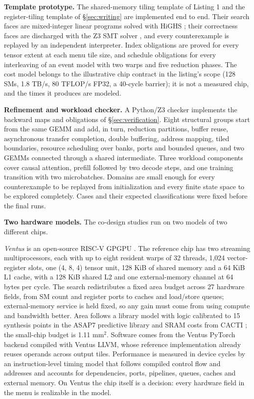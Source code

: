\documentclass[11pt]{article}
\begin{document}
\textbf{Template prototype.} The shared-memory tiling template of Listing 1 and the register-tiling template of §\ref{sec:writing} are implemented end to end. Their search faces are mixed-integer linear programs solved with HiGHS \cite{r91}; their correctness faces are discharged with the Z3 SMT solver \cite{r90}, and every counterexample is replayed by an independent interpreter. Index obligations are proved for every tensor extent at each menu tile size, and schedule obligations for every interleaving of an event model with two warps and five reduction phases. The cost model belongs to the illustrative chip contract in the listing's scope (128 SMs, 1.8 TB/s, 80 TFLOP/s FP32, a 40-cycle barrier); it is not a measured chip, and the times it produces are modeled.

\textbf{Refinement and workload checker.} A Python/Z3 checker implements the backward maps and obligations of §\ref{sec:verification}. Eight structural groups start from the same GEMM and add, in turn, reduction partitions, buffer reuse, asynchronous transfer completion, double buffering, address mapping, tiled boundaries, resource scheduling over banks, ports and bounded queues, and two GEMMs connected through a shared intermediate. Three workload components cover causal attention, prefill followed by two decode steps, and one training transition with two microbatches. Domains are small enough for every counterexample to be replayed from initialization and every finite state space to be explored completely. Cases and their expected classifications were fixed before the final runs.

\textbf{Two hardware models.} The co-design studies run on two models of two different chips.

\emph{Ventus} is an open-source RISC-V GPGPU \cite{r89}. The reference chip has two streaming multiprocessors, each with up to eight resident warps of 32 threads, 1,024 vector-register slots, one (4, 8, 4) tensor unit, 128 KiB of shared memory and a 64 KiB L1 cache, with a 128 KiB shared L2 and one external-memory channel at 64 bytes per cycle. The search redistributes a fixed area budget across 27 hardware fields, from SM count and register ports to caches and load/store queues; external-memory service is held fixed, so any gain must come from using compute and bandwidth better. Area follows a library model with logic calibrated to 15 synthesis points in the ASAP7 predictive library \cite{r92} and SRAM costs from CACTI \cite{r56}; the small-chip budget is 1.11 mm\(^2\). Software comes from the Ventus PyTorch backend compiled with Ventus LLVM, whose reference implementation already reuses operands across output tiles. Performance is measured in device cycles by an instruction-level timing model that follows compiled control flow and addresses and accounts for dependencies, ports, pipelines, queues, caches and external memory. On Ventus the chip itself is a decision: every hardware field in the menu is realizable in the model.
\end{document}
